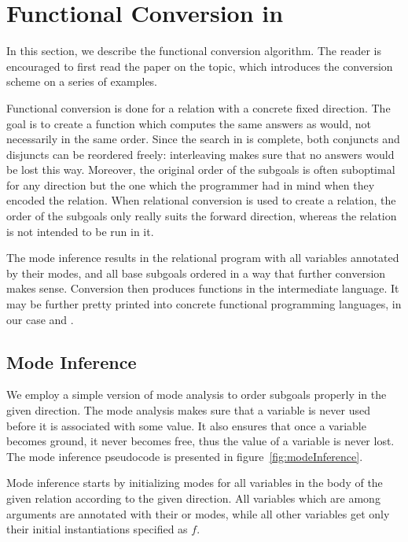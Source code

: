 \section{Functional Conversion in \mk}

In this section, we describe the functional conversion algorithm.
The reader is encouraged to first read the paper  on the topic, which introduces the conversion scheme on a series of examples.

Functional conversion is done for a relation with a concrete fixed direction.
The goal is to create a function which computes the same answers as \mk would, not necessarily in the same order.
Since the search in \mk is complete, both conjuncts and disjuncts can be reordered freely: interleaving makes sure that no answers would be lost this way.
Moreover, the original order of the subgoals is often suboptimal for any direction but the one which the programmer had in mind when they encoded the relation.
When relational conversion is used to create a relation, the order of the subgoals only really suits the forward direction, whereas the relation is not intended to be run in it.

The mode inference results in the relational program with all variables annotated by their modes, and all base subgoals ordered in a way that further conversion makes sense.
Conversion then produces functions in the intermediate language.
It may be further pretty printed into concrete functional programming languages, in our case \haskell and \ocaml.


\subsection{Mode Inference}

We employ a simple version of mode analysis to order subgoals properly in the given direction.
The mode analysis makes sure that a variable is never used before it is associated with some value.
It also ensures that once a variable becomes ground, it never becomes free, thus the value of a variable is never lost.
The mode inference pseudocode is presented in figure~\ref{fig:modeInference}.



Mode inference starts by initializing modes for all variables in the body of the given relation according to the given direction.
All variables which are among arguments are annotated with their \inm or \outm modes, while all other variables get only their initial instantiations specified as $f$.


